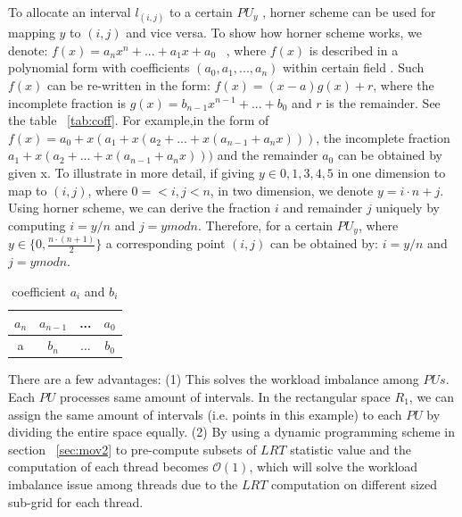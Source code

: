 \documentclass[AMA,LATO1COL]{WileyNJD-v2}
\newcommand\bigo{\mathcal O}
\begin{document}
To allocate an interval $l_{(i,j)}$ to a certain $PU_y$ , horner scheme can be used for mapping $y$ to $(i,j)$ and vice versa. To show how horner scheme works, we denote:
$f(x)= a_nx^n+ ...+ a_1x+ a_0$ ~\cite{horner}, where $f(x)$ is described in a polynomial form with coefficients $(a_0,a_1,...,a_n)$ within certain field . Such $f(x)$ can be re-written in the form: $f(x)= (x-a)g(x)+r$, where the incomplete fraction is $g(x)=b_{n-1}x^{n-1}+...+b_0$ and $r$ is the remainder. See the table ~\ref{tab:coff}. For example,in the form of $f(x)=a_0+x(a_1+x(a_2+...+x(a_{n-1}+a_nx)))$, the incomplete fraction $a_1+x(a_2+...+x(a_{n-1}+a_nx)))$ and the remainder $a_0$ can be obtained by given x. To illustrate in more detail, if giving  $y\in {0,1,3,4,5}$ in one dimension  to map to $(i,j)$, where $0=<i,j<n$, in two dimension, we denote $y=i\cdot n+j$. Using horner scheme, we can derive the fraction $i$ and remainder $j$ uniquely by computing $i=y/n$ and $j=y mod n$. Therefore, for a certain $PU_y$, where $y\in \{0,\frac{n \cdot (n+1)}{2}\}$  a corresponding point $(i,j)$ can be obtained by: $i= y /n$ and $j=y mod n$. %
 
 \begin{table}[t]
\centering \caption{ coefficient $a_i$ and $b_i$ \label{tab:coff}}
     \begin{tabular}{|c|c|c|c|}
	\hline
    $a_n$  &  $a_{n-1}$ &...& $a_0$ \\
	\hline
    a  &  $b_n$ &...&$b_0$  \\
    \hline
\end{tabular}
\label{lrt-compute}
\end{table}



There are a few advantages: (1) This solves the workload imbalance among $PUs$. Each $PU$ processes same amount of intervals. In the rectangular space $R_1$, we can assign the same amount of intervals (i.e. points in this example) to each $PU$ by dividing the entire space equally. (2) By using a dynamic programming scheme in section ~\ref{sec:mov2} to pre-compute subsets of $LRT$ statistic value and the computation of each thread becomes $\bigo(1)$, which will solve the workload imbalance issue among threads due to the $LRT$ computation on different sized sub-grid for each thread.
\end{document}
